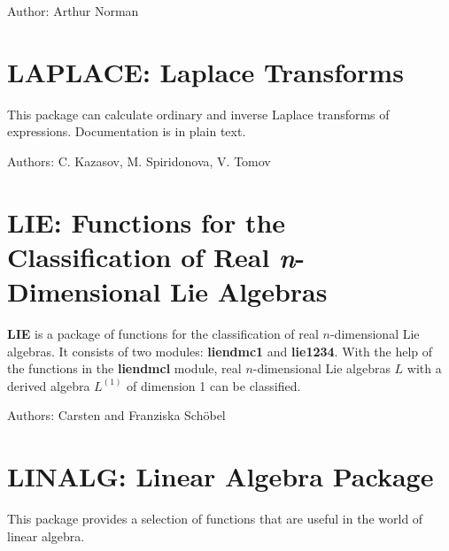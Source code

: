 Author: Arthur Norman



\newpage

\section{LAPLACE: Laplace Transforms}

This package can calculate ordinary and inverse Laplace transforms of
expressions.  Documentation is in plain text.

Authors: C. Kazasov, M. Spiridonova, V. Tomov



\newpage

\section{LIE: Functions for the Classification of Real \emph{n}-Dimensional Lie
Algebras}

\textbf{LIE} is a package of functions for the classification of real
$n$-dimensional Lie algebras.  It consists of two modules: \textbf{liendmc1}
and \textbf{lie1234}.  With the help of the functions in the \textbf{liendmcl}
module, real $n$-dimensional Lie algebras $L$ with a derived algebra
$L^{(1)}$ of dimension 1 can be classified.

Authors: Carsten and Franziska Sch\"obel



\newpage

\newpage

\section{LINALG: Linear Algebra Package}
\label{LINALG}

This package provides a selection of functions that are useful
in the world of linear algebra.

